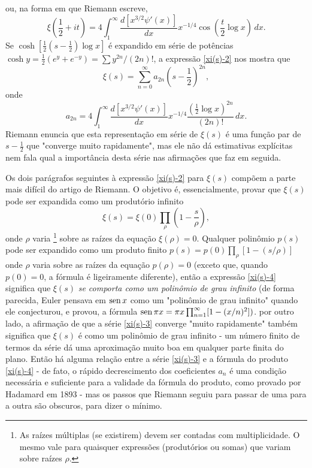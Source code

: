     ou, na forma em que Riemann escreve,
    \begin{equation*}
        \label{xi(s)-2}
        \xi \left( \frac{1}{2} + it \right) = 4\int_{1}^{\infty} \frac{d[x^{3/2}\psi'(x)]}{dx} x^{-1/4} \cos \left( \frac{t}{2} \log x \right) \, dx.
    \end{equation*}
    Se $\cosh \left[ \frac{1}{2} \left( s - \frac{1}{2} \right) \log x \right]$ é expandido em série de potências $\cosh y = \frac{1}{2}(e^y + e^{-y}) =  \sum y^{2n}/(2n)!$, a expressão \eqref{xi(s)-2} nos mostra que
    \begin{equation}
        \label{xi(s)-3}
        \xi(s) = \sum_{n=0}^{\infty} a_{2n} \left(s - \frac{1}{2} \right)^{2n},
    \end{equation}
    onde
    \begin{equation*}
        a_{2n} = 4\int_{1}^{\infty} \frac{d[x^{3/2}\psi'(x)]}{dx} x^{-1/4} \frac{\left( \frac{1}{2} \log x \right)^{2n}}{(2n)!} \, dx.
    \end{equation*}
    Riemann enuncia que esta representação em série de $\xi(s)$ é uma função par de $s - \frac{1}{2}$ que "converge muito rapidamente", mas ele não dá estimativas explícitas nem fala qual a importância desta série nas afirmações que faz em seguida. 
    
    Os dois parágrafos seguintes à expressão \eqref{xi(s)-2} para $\xi(s)$ compõem a parte mais difícil do artigo de Riemann. O objetivo é, essencialmente, provar que $\xi(s)$ pode ser expandida como um produtório infinito
    \begin{equation}
        \label{xi(s)-4}
        \xi(s) = \xi(0) \prod_{\rho} \left( 1 - \frac{s}{\rho}\right),
    \end{equation}
    onde $\rho$ varia
    \footnote{As raízes múltiplas (se existirem) devem ser contadas com multiplicidade. O mesmo vale para quaisquer expressões (produtórios ou somas) que variam sobre raízes $\rho$.}
    sobre as raízes da equação $\xi(\rho) = 0$. Qualquer polinômio $p(s)$ pode ser expandido como um produto finito $p(s) = p(0) \prod_{\rho}[1 - (s/\rho)]$ onde $\rho$ varia sobre as raízes da equação $p(\rho) = 0$ (exceto que, quando $p(0) = 0$, a fórmula é ligeiramente diferente), então a expressão \eqref{xi(s)-4} significa que $\xi(s)$ \textit{se comporta como um polinômio de grau infinito} (de forma parecida, Euler pensava em $\operatorname{sen} x$ como um "polinômio de grau infinito" quando ele conjecturou, e provou, a fórmula $\operatorname{sen} \pi x = \pi x \prod_{n=1}^{\infty} [1 - (x/n)^2])$. por outro lado, a afirmação de que a série \eqref{xi(s)-3} converge "muito rapidamente" também significa que $\xi(s)$ é como um polinômio de grau infinito - um número finito de termos da série dá uma aproximação muito boa em qualquer parte finita do plano. Então há alguma relação entre a série \eqref{xi(s)-3} e a fórmula do produto \eqref{xi(s)-4} - de fato, o rápido decrescimento dos coeficientes $a_n$ é uma condição necessária e suficiente para a validade da fórmula do produto, como provado por Hadamard em 1893 - mas os passos que Riemann seguiu para passar de uma para a outra são obscuros, para dizer o mínimo.
    
